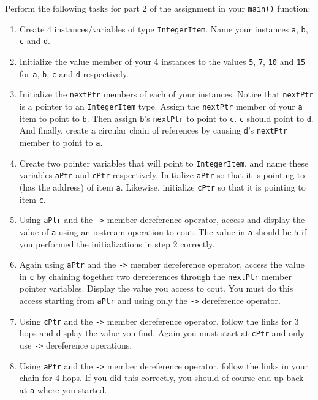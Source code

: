 \documentclass[11pt]{article}
\begin{document}
Perform the following tasks for part 2 of the assignment in your \verb~main()~ function:

\begin{enumerate}
\item Create 4 instances/variables of type \verb~IntegerItem~.  Name your
   instances \verb~a~, \verb~b~, \verb~c~ and \verb~d~.
\item Initialize the value member of your 4 instances to the values \verb~5~,
   \verb~7~, \verb~10~ and \verb~15~ for \verb~a~, \verb~b~, \verb~c~ and \verb~d~ respectively.
\item Initialize the \verb~nextPtr~ members of each of your instances.  Notice
   that \verb~nextPtr~ is a pointer to an \verb~IntegerItem~ type.  Assign the
   \verb~nextPtr~ member of your \verb~a~ item to point to \verb~b~.  Then assign
   \verb~b~'s \verb~nextPtr~ to point to \verb~c~.  \verb~c~ should point to \verb~d~.  And
   finally, create a circular chain of references by causing \verb~d~'s
   \verb~nextPtr~ member to point to \verb~a~.
\item Create two pointer variables that will point to \verb~IntegerItem~, and
   name these variables \verb~aPtr~ and \verb~cPtr~ respectively.  Initialize 
   \verb~aPtr~ so that it is pointing to (has the address) of item \verb~a~.
   Likewise, initialize \verb~cPtr~ so that it is pointing to item \verb~c~.
\item Using \verb~aPtr~ and the \verb~->~ member dereference operator, access and
   display the value of \verb~a~ using an iostream operation to cout.  The
   value in \verb~a~ should be \verb~5~ if you performed the initializations in
   step 2 correctly.
\item Again using \verb~aPtr~ and the \verb~->~ member dereference operator, access the
   value in \verb~c~ by chaining together two dereferences through the \verb~nextPtr~
   member pointer variables.  Display the value you access to cout.  You must
   do this access starting from \verb~aPtr~ and using only the \verb~->~ dereference operator.
\item Using \verb~cPtr~ and the \verb~->~ member dereference operator, follow the links
   for 3 hops and display the value you find.  Again you must start at \verb~cPtr~
   and only use \verb~->~ dereference operations.
\item Using \verb~aPtr~ and the \verb~->~ member dereference operator, follow the
   links in your chain for 4 hops.  If you did this correctly, you
   should of course end up back at \verb~a~ where you started.
\end{enumerate}
\end{document}
